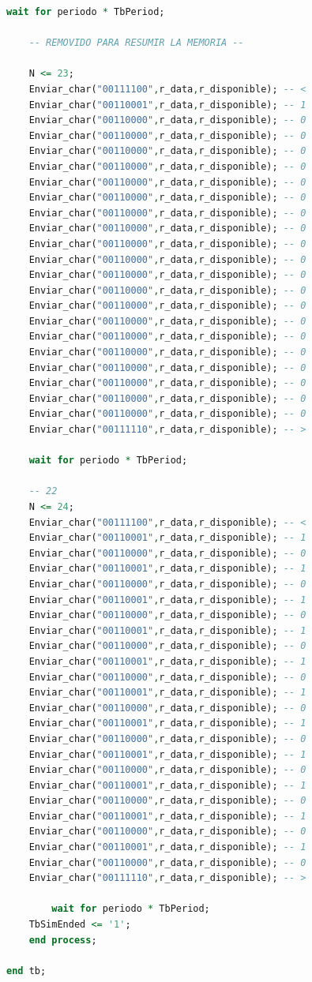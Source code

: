 \begin{lstlisting}[language = vhdl,caption=Testbench del módulo enclavamiento,label={lst:test_separador}]
	wait for periodo * TbPeriod;

	-- REMOVIDO PARA RESUMIR LA MEMORIA --
	
	N <= 23; 	
	Enviar_char("00111100",r_data,r_disponible); -- < 	
	Enviar_char("00110001",r_data,r_disponible); -- 1 	
	Enviar_char("00110000",r_data,r_disponible); -- 0
 	Enviar_char("00110000",r_data,r_disponible); -- 0 	
	Enviar_char("00110000",r_data,r_disponible); -- 0
	Enviar_char("00110000",r_data,r_disponible); -- 0 	
	Enviar_char("00110000",r_data,r_disponible); -- 0
	Enviar_char("00110000",r_data,r_disponible); -- 0 	
	Enviar_char("00110000",r_data,r_disponible); -- 0
	Enviar_char("00110000",r_data,r_disponible); -- 0 	
	Enviar_char("00110000",r_data,r_disponible); -- 0
	Enviar_char("00110000",r_data,r_disponible); -- 0 	
	Enviar_char("00110000",r_data,r_disponible); -- 0
	Enviar_char("00110000",r_data,r_disponible); -- 0 	
	Enviar_char("00110000",r_data,r_disponible); -- 0
	Enviar_char("00110000",r_data,r_disponible); -- 0 	
	Enviar_char("00110000",r_data,r_disponible); -- 0
	Enviar_char("00110000",r_data,r_disponible); -- 0 	
	Enviar_char("00110000",r_data,r_disponible); -- 0
	Enviar_char("00110000",r_data,r_disponible); -- 0 	
	Enviar_char("00110000",r_data,r_disponible); -- 0
	Enviar_char("00110000",r_data,r_disponible); -- 0 	
	Enviar_char("00111110",r_data,r_disponible); -- >

	wait for periodo * TbPeriod;

	-- 22
	N <= 24; 	
	Enviar_char("00111100",r_data,r_disponible); -- < 	
	Enviar_char("00110001",r_data,r_disponible); -- 1 	
	Enviar_char("00110000",r_data,r_disponible); -- 0
 	Enviar_char("00110001",r_data,r_disponible); -- 1 	
	Enviar_char("00110000",r_data,r_disponible); -- 0
	Enviar_char("00110001",r_data,r_disponible); -- 1 	
	Enviar_char("00110000",r_data,r_disponible); -- 0
	Enviar_char("00110001",r_data,r_disponible); -- 1 	
	Enviar_char("00110000",r_data,r_disponible); -- 0
	Enviar_char("00110001",r_data,r_disponible); -- 1 	
	Enviar_char("00110000",r_data,r_disponible); -- 0
	Enviar_char("00110001",r_data,r_disponible); -- 1 	
	Enviar_char("00110000",r_data,r_disponible); -- 0
	Enviar_char("00110001",r_data,r_disponible); -- 1 	
	Enviar_char("00110000",r_data,r_disponible); -- 0
	Enviar_char("00110001",r_data,r_disponible); -- 1 	
	Enviar_char("00110000",r_data,r_disponible); -- 0
	Enviar_char("00110001",r_data,r_disponible); -- 1 	
	Enviar_char("00110000",r_data,r_disponible); -- 0
	Enviar_char("00110001",r_data,r_disponible); -- 1 	
	Enviar_char("00110000",r_data,r_disponible); -- 0
	Enviar_char("00110001",r_data,r_disponible); -- 1 
	Enviar_char("00110000",r_data,r_disponible); -- 0	
	Enviar_char("00111110",r_data,r_disponible); -- >
	
        wait for periodo * TbPeriod;
	TbSimEnded <= '1';
    end process;
	
end tb;
		\end{lstlisting}
			
